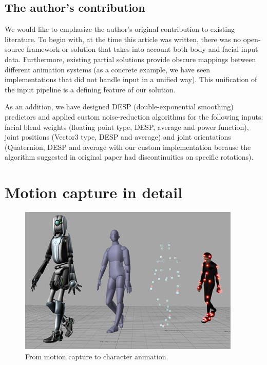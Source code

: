 \documentclass[a4paper, 12pt]{amsart}
\begin{document}
\subsection{The author's contribution}

We would like to emphasize the author's original contribution to existing literature. To begin with, at the time this article was written, there was no open-source framework or solution that takes into account both body and facial input data. Furthermore, existing partial solutions provide obscure mappings between different animation systems (as a concrete example, we have seen implementations that did not handle input in a unified way). This unification of the input pipeline is a defining feature of our solution.

As an addition, we have designed DESP (double-exponential smoothing) predictors and applied custom noise-reduction algorithms for the following inputs: facial blend weights (floating point type, DESP, average and power function), joint positions (Vector3 type, DESP and average) and joint orientations (Quaternion, DESP and average with our custom implementation because the algorithm suggested in original paper had discontinuities on specific rotations).

\clearpage

\section{Motion capture in detail}

\begin{figure}[htb]
\centering
\includegraphics[width=.9\linewidth]{fig_motion_capture}
\caption{From motion capture to character animation.}
\label{fig:motion_capture}
\end{figure}
\end{document}
